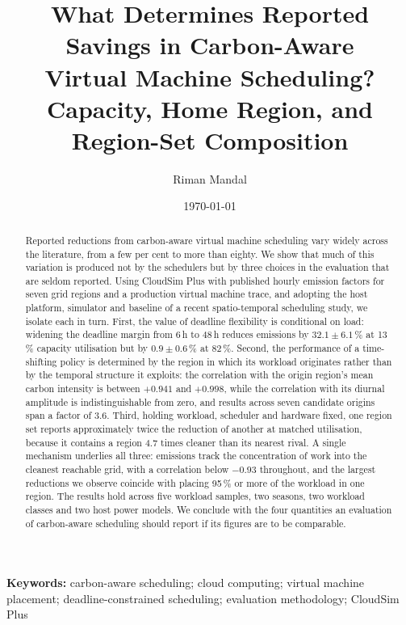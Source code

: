 \documentclass[11pt,a4paper]{article}
\title{What Determines Reported Savings in Carbon-Aware\\
       Virtual Machine Scheduling?\\
       \large Capacity, Home Region, and Region-Set Composition}
\author{Riman Mandal}
\date{\today}
\begin{document}
\maketitle

\begin{abstract}
Reported reductions from carbon-aware virtual machine scheduling vary widely
across the literature, from a few per cent to more than eighty. We show that
much of this variation is produced not by the schedulers but by three choices in
the evaluation that are seldom reported. Using CloudSim Plus with published
hourly emission factors for seven grid regions and a production virtual machine
trace, and adopting the host platform, simulator and baseline of a recent
spatio-temporal scheduling study, we isolate each in turn. First, the value of
deadline flexibility is conditional on load: widening the deadline margin from
6\,h to 48\,h reduces emissions by $32.1 \pm 6.1$\,\% at 13\,\% capacity
utilisation but by $0.9 \pm 0.6$\,\% at 82\,\%. Second, the performance of a
time-shifting policy is determined by the region in which its workload
originates rather than by the temporal structure it exploits: the correlation
with the origin region's mean carbon intensity is between $+0.941$ and $+0.998$,
while the correlation with its diurnal amplitude is indistinguishable from zero,
and results across seven candidate origins span a factor of 3.6. Third, holding
workload, scheduler and hardware fixed, one region set reports approximately
twice the reduction of another at matched utilisation, because it contains a
region 4.7 times cleaner than its nearest rival. A single mechanism underlies
all three: emissions track the concentration of work into the cleanest reachable
grid, with a correlation below $-0.93$ throughout, and the largest reductions we
observe coincide with placing 95\,\% or more of the workload in one region. The
results hold across five workload samples, two seasons, two workload classes and
two host power models. We conclude with the four quantities an evaluation of
carbon-aware scheduling should report if its figures are to be comparable.
\end{abstract}

\vspace{1em}
\noindent\textbf{Keywords:} carbon-aware scheduling; cloud computing; virtual
machine placement; deadline-constrained scheduling; evaluation methodology;
CloudSim Plus


\end{document}
